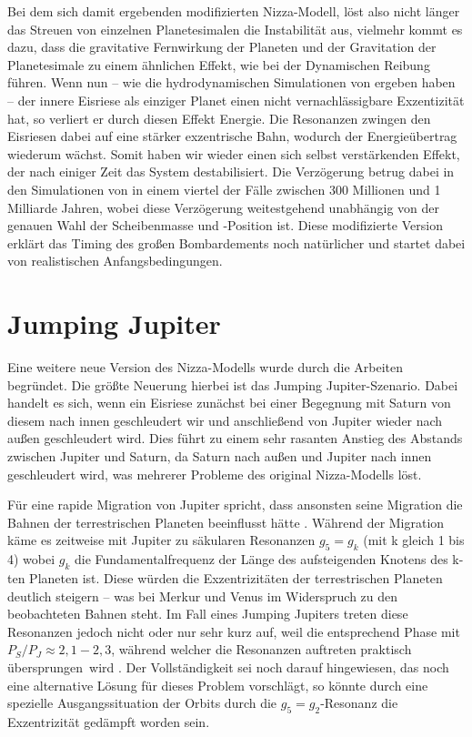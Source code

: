 \documentclass[12pt,a4paper,twoside,open=right,bibliography=totoc]{scrbook}
\renewcommand{\cite}{ \citep}
\begin{document}
Bei dem sich damit ergebenden modifizierten Nizza-Modell, löst also nicht länger das Streuen von einzelnen Planetesimalen die Instabilität aus, vielmehr kommt es dazu, dass die gravitative Fernwirkung der Planeten und der Gravitation der Planetesimale zu einem ähnlichen Effekt, wie bei der Dynamischen Reibung führen.
Wenn nun -- wie die hydrodynamischen Simulationen von \cite{Morbidelli2007b} ergeben haben -- der innere Eisriese als einziger Planet einen nicht vernachlässigbare Exzentizität hat, so verliert er durch diesen Effekt Energie. Die Resonanzen zwingen den Eisriesen dabei auf eine stärker exzentrische Bahn, wodurch der Energieübertrag wiederum wächst.
Somit haben wir wieder einen sich selbst verstärkenden Effekt, der nach einiger Zeit das System destabilisiert. Die Verzögerung betrug dabei in den Simulationen von \cite{Levison2011} in einem viertel der Fälle zwischen 300 Millionen und 1 Milliarde Jahren, wobei diese Verzögerung weitestgehend unabhängig von der genauen Wahl der Scheibenmasse und -Position ist.
Diese modifizierte Version erklärt das Timing des großen Bombardements noch natürlicher und startet dabei von realistischen Anfangsbedingungen.

\section{Jumping Jupiter}\label{jumpingjupiter}
Eine weitere neue Version des Nizza-Modells wurde durch die Arbeiten \cite{Morbidelli2009,Brasser2009,Morbidelli2010} begründet. Die größte Neuerung hierbei ist das \glqq Jumping Jupiter-Szenario\grqq.
Dabei handelt es sich, wenn ein Eisriese zunächst bei einer Begegnung mit Saturn von diesem nach innen geschleudert wir und anschließend von Jupiter wieder nach außen geschleudert wird.
Dies führt zu einem sehr rasanten Anstieg des Abstands zwischen Jupiter und Saturn, da Saturn nach außen und Jupiter nach innen geschleudert wird, was mehrerer Probleme des original Nizza-Modells löst.

Für eine rapide Migration von Jupiter spricht, dass ansonsten seine Migration die Bahnen der terrestrischen Planeten beeinflusst hätte\cite{Brasser2009}. Während der Migration käme es zeitweise mit Jupiter zu säkularen Resonanzen $g_5 = g_k$ (mit k gleich 1 bis 4) wobei $g_k$ die Fundamentalfrequenz der Länge des aufsteigenden Knotens des k-ten Planeten ist. Diese würden die Exzentrizitäten der terrestrischen Planeten deutlich steigern – was bei Merkur und Venus im Widerspruch zu den beobachteten Bahnen steht. Im Fall eines Jumping Jupiters treten diese Resonanzen jedoch nicht oder nur sehr kurz auf, weil die entsprechend Phase mit $P_S/P_J\approx2,1-2,3$, während welcher die Resonanzen auftreten praktisch \glqq übersprungen\grqq\ wird\cite{Brasser2009}.
Der Vollständigkeit sei noch darauf hingewiesen, das \cite{Brasser2009} noch eine alternative Lösung für dieses Problem vorschlägt, so könnte durch eine spezielle Ausgangssituation der Orbits durch die $g_5=g_2$-Resonanz die Exzentrizität gedämpft worden sein.
\end{document}
